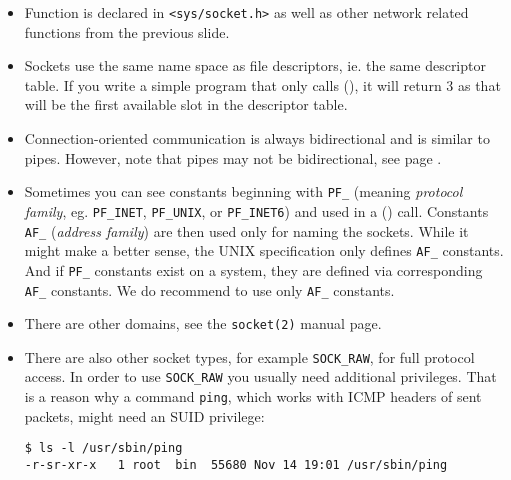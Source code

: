 \begin{itemize}
\item Function is declared in \texttt{<sys/socket.h>} as well as other network
related functions from the previous slide.
\item Sockets use the same name space as file descriptors, ie. the same
descriptor table.  If you write a simple program that only calls
(), it will return 3 as that will be the first available slot in
the descriptor table.
\item Connection-oriented communication is always bidirectional and is similar
to pipes.  However, note that pipes may not be bidirectional, see page
\pageref{TWO_WAY_PIPES}.
\item Sometimes you can see constants beginning with \verb#PF_# (meaning
\emph{protocol family}, eg. \texttt{PF\_IN\-ET}, \verb#PF_UNIX#, or
\texttt{PF\_IN\-ET6}) and used in a () call. Constants \verb#AF_#
(\emph{address family}) are then used only for naming the sockets.  While it
might make a better sense, the UNIX specification only defines \verb#AF_#
constants.  And if \verb#PF_# constants exist on a system, they are defined via
corresponding \verb#AF_# constants.  We do recommend to use only \verb#AF_#
constants.
\item There are other domains, see the \texttt{socket(2)} manual page.
\item There are also other socket types, for example \texttt{SOCK\_RAW}, for
full protocol access. In order to use \texttt{SOCK\_RAW} you usually need
additional privileges.  That is a reason why a command \texttt{ping}, which
works with ICMP headers of sent packets, might need an SUID privilege:

\begin{verbatim}
$ ls -l /usr/sbin/ping
-r-sr-xr-x   1 root  bin  55680 Nov 14 19:01 /usr/sbin/ping
\end{verbatim}
\end{itemize}



